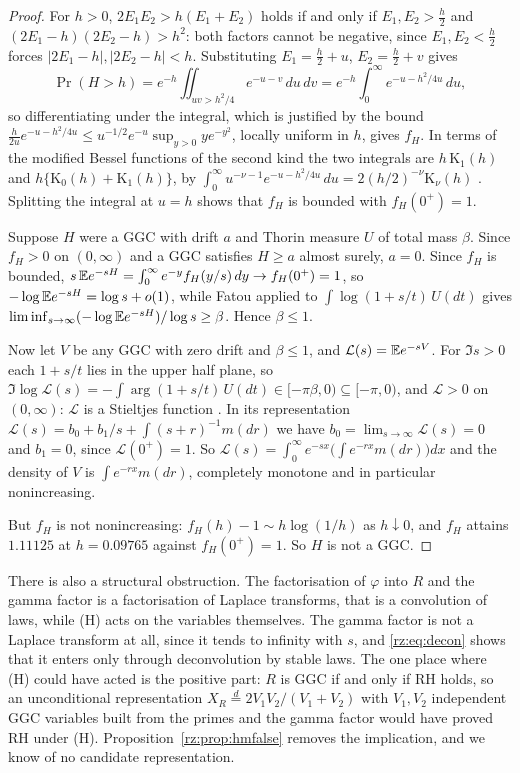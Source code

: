 \begin{proof}
For $h>0$, $2E_1E_2>h(E_1+E_2)$ holds if and only if $E_1,E_2>\frac h2$ and $(2E_1-h)(2E_2-h)>h^2$: both factors cannot be negative, since $E_1,E_2<\frac h2$ forces $|2E_1-h|,|2E_2-h|<h$. Substituting $E_1=\frac h2+u$, $E_2=\frac h2+v$ gives
\[
\Pr(H>h)=e^{-h}\iint_{uv>h^2/4}e^{-u-v}\,du\,dv=e^{-h}\int_0^\infty e^{-u-h^2/4u}\,du,
\]
so differentiating under the integral, which is justified by the bound $\frac h{2u}e^{-u-h^2/4u}\le u^{-1/2}e^{-u}\sup_{y>0}ye^{-y^2}$, locally uniform in $h$, gives $f_H$. In terms of the modified Bessel functions of the second kind the two integrals are $h\,\mathrm{K}_1(h)$ and $h\{\mathrm{K}_0(h)+\mathrm{K}_1(h)\}$, by $\int_0^\infty u^{-\nu-1}e^{-u-h^2/4u}\,du=2(h/2)^{-\nu}\mathrm{K}_\nu(h)$ \cite[(10.32.10)]{DLMF}. Splitting the integral at $u=h$ shows that $f_H$ is bounded with $f_H(0^+)=1$.

Suppose $H$ were a GGC with drift $a$ and Thorin measure $U$ of total mass $\beta$. Since $f_H>0$ on $(0,\infty)$ and a GGC satisfies $H\ge a$ almost surely, $a=0$. Since $f_H$ is bounded, $s\,\mathbb{E} e^{-sH}=\int_0^\infty e^{-y}f_H(y/s)\,dy\to f_H(0^+)=1$, so $-\log\mathbb{E} e^{-sH}=\log s+o(1)$, while Fatou applied to $\int\log(1+s/t)\,U(dt)$ gives $\liminf_{s\to\infty}(-\log\mathbb{E} e^{-sH})/\log s\ge\beta$. Hence $\beta\le1$.

Now let $V$ be any GGC with zero drift and $\beta\le1$, and $\mathcal L(s)=\mathbb{E} e^{-sV}$. For $\Im s>0$ each $1+s/t$ lies in the upper half plane, so $\Im\log\mathcal L(s)=-\int\arg(1+s/t)\,U(dt)\in[-\pi\beta,0)\subseteq[-\pi,0)$, and $\mathcal L>0$ on $(0,\infty)$: $\mathcal L$ is a Stieltjes function \cite[Corollary~7.4]{boSSV}. In its representation $\mathcal L(s)=b_0+b_1/s+\int(s+r)^{-1}m(dr)$ \cite[Definition~2.1]{boSSV} we have $b_0=\lim_{s\to\infty}\mathcal L(s)=0$ and $b_1=0$, since $\mathcal L(0^+)=1$. So $\mathcal L(s)=\int_0^\infty e^{-sx}\bigl(\int e^{-rx}m(dr)\bigr)dx$ and the density of $V$ is $\int e^{-rx}m(dr)$, completely monotone and in particular nonincreasing.

But $f_H$ is not nonincreasing: $f_H(h)-1\sim h\log(1/h)$ as $h\downarrow0$, and $f_H$ attains $1.11125$ at $h=0.09765$ against $f_H(0^+)=1$. So $H$ is not a GGC.
\end{proof}

There is also a structural obstruction. The factorisation of $\varphi$ into $R$ and the gamma factor is a factorisation of Laplace transforms, that is a convolution of laws, while (H) acts on the variables themselves. The gamma factor is not a Laplace transform at all, since it tends to infinity with $s$, and \eqref{rz:eq:decon} shows that it enters only through deconvolution by stable laws. The one place where (H) could have acted is the positive part: $R$ is GGC if and only if RH holds, so an unconditional representation $X_R\overset{d}{=}2V_1V_2/(V_1+V_2)$ with $V_1,V_2$ independent GGC variables built from the primes and the gamma factor would have proved RH under (H). Proposition~\ref{rz:prop:hmfalse} removes the implication, and we know of no candidate representation.

